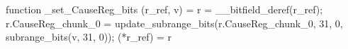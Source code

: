 function _set_CauseReg_bits (r_ref, v) = {
    r = __bitfield_deref(r_ref);
    r.CauseReg_chunk_0 = update_subrange_bits(r.CauseReg_chunk_0, 31, 0, subrange_bits(v, 31, 0));
    (*r_ref) = r
}
